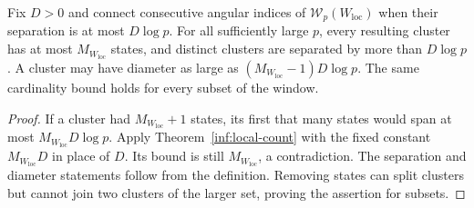 \begin{corollary}\label{inf:clusters}
Fix $D>0$ and connect consecutive angular indices of
$\mathcal W_p(W_{\mathrm{loc}})$ when their separation is at most
$D\log p$. For all sufficiently large $p$, every resulting
cluster has at most $M_{W_{\mathrm{loc}}}$ states, and distinct
clusters are separated by more than $D\log p$.
A cluster may have diameter as large as
$(M_{W_{\mathrm{loc}}}-1)D\log p$.
The same cardinality bound holds for every subset of the window.
\end{corollary}
\begin{proof}
If a cluster had $M_{W_{\mathrm{loc}}}+1$ states, its first that
many states would span at most
$M_{W_{\mathrm{loc}}}D\log p$.
Apply Theorem~\ref{inf:local-count} with the fixed constant
$M_{W_{\mathrm{loc}}}D$ in place of $D$.
Its bound is still $M_{W_{\mathrm{loc}}}$, a contradiction.
The separation and diameter statements follow from the definition.
Removing states can split clusters but cannot join two clusters
of the larger set, proving the assertion for subsets.
\end{proof}


